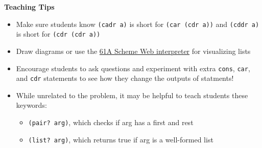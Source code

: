 \begin{blocksection}
\begin{guide}
\textbf{Teaching Tips}
\begin{itemize}
  \item Make sure students know \lstinline{(cadr a)} is short for \lstinline{(car (cdr a))} and \lstinline{(cddr a)} is short for \lstinline{(cdr (cdr a))}
  \item Draw diagrams or use the \href{https://code.cs61a.org/}{61A Scheme Web interpreter} for visualizing lists
  \item Encourage students to ask questions and experiment with extra \lstinline{cons}, \lstinline{car}, and \lstinline{cdr} statements to see how they change the outputs of statments!
  \item While unrelated to the problem, it may be helpful to teach students these keywords:
  \begin{itemize}
    \item\lstinline{(pair? arg)}, which checks if arg has a first and rest
    \item\lstinline{(list? arg)}, which returns true if arg is a well-formed list
  \end{itemize}
\end{itemize}
\end{guide}
\end{blocksection}
